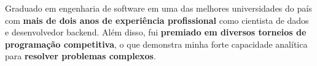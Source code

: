 \documentclass[a4paper,12pt]{article}
\begin{document}

Graduado em engenharia de software em uma das melhores universidades do país
com \textbf{mais de dois anos de experiência profissional} como cientista de dados e desenvolvedor backend.
Além disso, fui \textbf{premiado em diversos torneios de programação competitiva}, o que demonstra minha forte
capacidade analítica para \textbf{resolver problemas complexos}.
\end{document}
